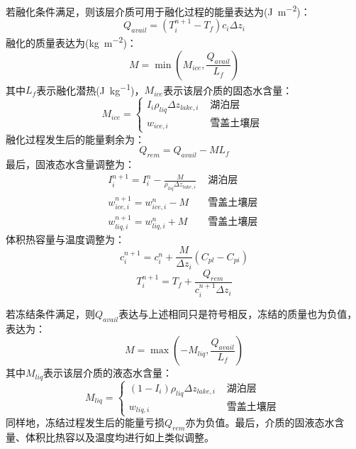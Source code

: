 若融化条件满足，则该层介质可用于融化过程的能量表达为(\unit{J.m^{-2}})：
\begin{equation}
Q_{avail}=\left(T_{i}^{n+1}-T_{f}\right) c_{i} \Delta z_{i}
\end{equation}
融化的质量表达为(\unit{kg.m^{-2}})：
\begin{equation}
M=\min \left(M_{ice}, \frac{Q_{a v a i l}}{L_{f}}\right)
\end{equation}
其中$L_f$表示融化潜热(\unit{J.kg^{-1}})，$M_{ice}$表示该层介质的固态水含量：
\begin{equation}
M_{ice}=\left\{\begin{array}{lr}I_{i} \rho_{liq} \Delta z_{lake, i} & 
    \text { 湖泊层 } \\ w_{ice, i} & \text { 雪盖土壤层 }\end{array}\right.
\end{equation}
融化过程发生后的能量剩余为：
\begin{equation}
Q_{rem}=Q_{avail}-M L_{f}
\end{equation}
最后，固液态水含量调整为：
\begin{equation}
\begin{array}{cc}I_{i}^{n+1}=I_{i}^{n}-\frac{M}{\rho_{liq} \Delta z_{lake, i}} & \text { 湖泊层 } \\
     w_{ice, i}^{n+1}=w_{ice, i}^{n}-M & \text { 雪盖土壤层 } \\ 
     w_{liq, i}^{n+1}=w_{liq, i}^{n}+M & \text { 雪盖土壤层 }\end{array}
\end{equation}
体积热容量与温度调整为：
\begin{equation}
c_{i}^{n+1}=c_{i}^{n}+\frac{M}{\Delta z_{i}}\left(C_{p l}-C_{p i}\right)
\end{equation}
\begin{equation}
T_{i}^{n+1}=T_{f}+\frac{Q_{rem}}{c_{i}^{n+1} \Delta z_{i}}
\end{equation}

若冻结条件满足，则$Q_{avail}$表达与上述相同只是符号相反，冻结的质量也为负值，表达为：
\begin{equation}
M=\max \left(-M_{liq}, \frac{Q_{avail}}{L_{f}}\right)
\end{equation}
其中$M_{liq}$表示该层介质的液态水含量：
\begin{equation}
M_{liq}=\left\{\begin{array}{cc}\left(1-I_{i}\right) \rho_{liq} \Delta z_{lake, i} & \text { 湖泊层 } \\
     w_{liq, i} & \text { 雪盖土壤层 }\end{array}\right.
\end{equation}
同样地，冻结过程发生后的能量亏损$Q_{rem}$亦为负值。最后，介质的固液态水含量、体积比热容以及温度均进行如上类似调整。


